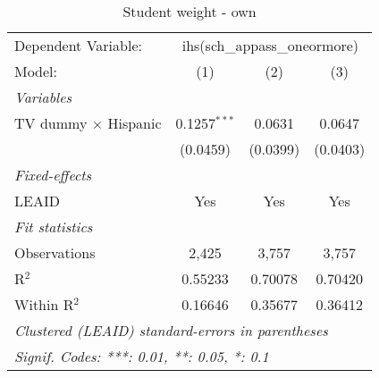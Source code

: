 \begin{table}[htbp]
\centering
\caption{Student weight - own}
\begin{tabular}{lccc}
\tabularnewline\midrule\midrule
Dependent Variable:&\multicolumn{3}{c}{ihs(sch\_appass\_oneormore)}\\
Model:&(1) & (2) & (3)\\
\midrule \emph{Variables}&   &   &  \\
TV dummy $\times$ Hispanic & 0.1257$^{***}$ & 0.0631 & 0.0647\\
  &(0.0459) & (0.0399) & (0.0403)\\
\midrule \emph{Fixed-effects}&   &   &  \\
LEAID & Yes & Yes & Yes\\
\midrule \emph{Fit statistics}&  & & \\
Observations & 2,425&3,757&3,757\\
R$^2$ & 0.55233&0.70078&0.70420\\
Within R$^2$ & 0.16646&0.35677&0.36412\\
\midrule\midrule\multicolumn{4}{l}{\emph{Clustered (LEAID) standard-errors in parentheses}}\\
\multicolumn{4}{l}{\emph{Signif. Codes: ***: 0.01, **: 0.05, *: 0.1}}\\
\end{tabular}
\end{table}

